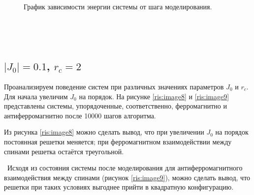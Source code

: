 \documentclass[14pt,a4paper,report]{ncc}
\begin{document}
\begin{figure}[h]
\begin{minipage}[h]{0.49\linewidth}
\end{minipage}
\hfill
\begin{minipage}[h]{0.49\linewidth}
\end{minipage}
\caption{График зависимости энергии системы от шага моделирования. }
\label{ris:image6}
\end{figure}
\

\
\newpage
\subsection{$|J_0|=0.1$, $r_c=2$}
Проанализируем поведение систем при различных значениях параметров $J_0$ и $r_c$.
Для начала увеличим $J_0$ на порядок.
На рисунке \ref{ris:image8} и \ref{ris:image9} представлены системы, упорядоченные, соответственно, ферромагнитно и антиферромагнитно после 10000 шагов алгоритма.
\

Из рисунка \ref{ris:image8} можно сделать вывод, что при увеличении $J_0$ на порядок постоянная решетки меняется; при ферромагнитном взаимодействии между спинами решетка остаётся треугольной. 

\
Исходя из состояния системы после моделирования для антиферромагнитного взаимодействия между спинами (рисунок \ref{ris:image9}), можно сделать вывод, что решетки при таких условиях выгоднее прийти в квадратную конфигурацию.
\end{document}
